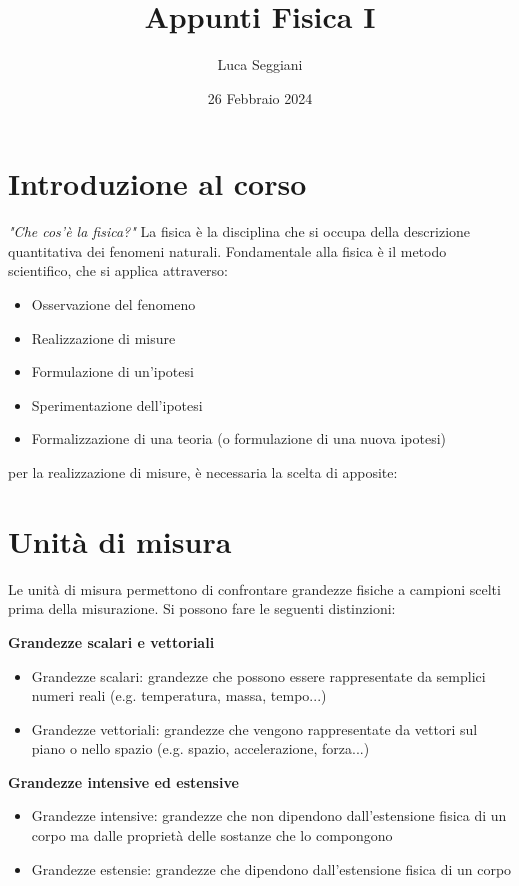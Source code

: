 \documentclass[a4paper,12pt]{article}
\title{Appunti Fisica I}
\author{Luca Seggiani}
\date{26 Febbraio 2024}
\begin{document}
\maketitle

\section{Introduzione al corso}
\textit{"Che cos'è la fisica?"} La fisica è la disciplina che si occupa della descrizione quantitativa dei
fenomeni naturali.
Fondamentale alla fisica è il metodo scientifico, che si applica attraverso:

\begin{itemize}
  \item Osservazione del fenomeno
  \item Realizzazione di misure
  \item Formulazione di un'ipotesi
  \item Sperimentazione dell'ipotesi
  \item Formalizzazione di una teoria (o formulazione di una nuova ipotesi)
\end{itemize}

per la realizzazione di misure, è necessaria la scelta di apposite:

\section{Unità di misura}
Le unità di misura permettono di confrontare grandezze fisiche a campioni scelti prima della misurazione. Si
possono fare le seguenti distinzioni:

\textbf{Grandezze scalari e vettoriali}
\begin{itemize}
  \item Grandezze scalari:
    grandezze che possono essere rappresentate da semplici numeri reali (e.g. temperatura, massa, tempo...)
  \item Grandezze vettoriali:
    grandezze che vengono rappresentate da vettori sul piano o nello spazio (e.g. spazio, accelerazione, forza...)
\end{itemize}

\newpage

\textbf{Grandezze intensive ed estensive}
\begin{itemize}
  \item Grandezze intensive:
    grandezze che non dipendono dall'estensione fisica di un corpo ma dalle proprietà delle sostanze che lo
    compongono
  \item Grandezze estensie:
    grandezze che dipendono dall'estensione fisica di un corpo
\end{itemize}
\end{document}
